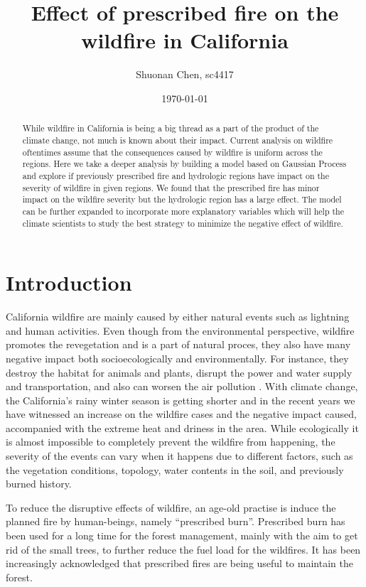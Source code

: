 \documentclass{article}
\begin{document}
\title{Effect of prescribed fire on the wildfire in California}
\date{\today}
\author{Shuonan Chen, sc4417}

\maketitle

\begin{abstract}
While wildfire in California is being a big thread as a part of the product of the climate change, not much is known about their impact. Current analysis on wildfire oftentimes assume that the consequences caused by wildfire is uniform across the regions. Here we take a deeper analysis by building a model based on Gaussian Process and explore if previously prescribed fire and hydrologic regions have impact on the severity of wildfire in given regions. We found that the prescribed fire has minor impact on the wildfire severity but the hydrologic region has a large effect. The model can be further expanded to incorporate more explanatory variables which will help the climate scientists to study the best strategy to minimize the negative effect of wildfire. 
\end{abstract}



\section{Introduction}
California wildfire are mainly caused by either natural events such as lightning and human activities. 
Even though from the environmental perspective, wildfire promotes the revegetation and is a part of natural proces, they also have many negative impact both socioecologically and environmentally. For instance, they destroy the habitat for animals and plants, disrupt the power and water supply and transportation, and also can worsen the air pollution \cite{moritz2014learning}. 
With climate change, the California's rainy winter season is getting shorter and in the recent years we have witnessed an increase on the wildfire cases and the negative impact caused, accompanied with the extreme heat and driness in the area. 
While ecologically it is almost impossible to completely prevent the wildfire from happening, the severity of the events can vary when it happens due to different factors, such as the vegetation conditions, topology, water contents in the soil, and previously burned history. 



To reduce the disruptive effects of wildfire, an age-old practise is induce the planned fire by human-beings, namely ``prescribed burn''. Prescribed burn has been used for a long time for the forest management, mainly with the aim to get rid of the small trees, to further reduce the fuel load for the wildfires. It has been increasingly acknowledged that prescribed fires are being useful to maintain the forest. 
\end{document}
